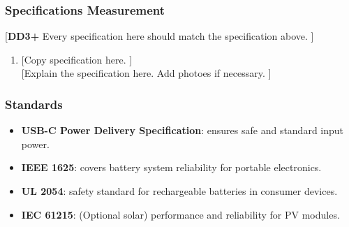 \subsubsection{Specifications Measurement}
[\textbf{DD3+} Every specification here should match the specification above. ]
\begin{enumerate}
    \item {[Copy specification here. ]} \\
          {[Explain the specification here. Add photoes if necessary. ]}
\end{enumerate}

\subsubsection{Standards}
\begin{itemize}
    \item \textbf{USB-C Power Delivery Specification}: ensures safe and standard input power.
    \item \textbf{IEEE 1625}: covers battery system reliability for portable electronics.
    \item \textbf{UL 2054}: safety standard for rechargeable batteries in consumer devices.
    \item \textbf{IEC 61215}: (Optional solar) performance and reliability for PV modules.
\end{itemize}
